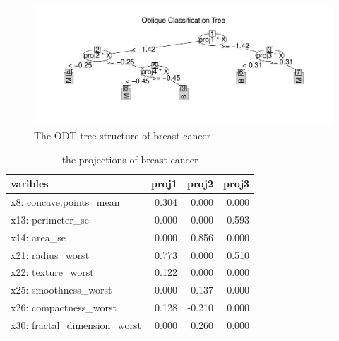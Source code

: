 \documentclass[nojss]{jss}
\numberwithin{equation}{section}
\begin{document}
\begin{figure}[t!]
\centering
\includegraphics{ODRF-plot}
\caption{\label{fig:cancer.tree} The ODT tree structure of breast cancer}
\end{figure}

\begin{table}[t!]
  \centering
    \begin{tabular}{lrrr}
    \toprule
    varibles & proj1 & proj2 & proj3 \\
    \midrule
    x8: concave.points\_mean & 0.304  & 0.000  & 0.000  \\
    x13: perimeter\_se & 0.000  & 0.000  & 0.593  \\
    x14: area\_se & 0.000  & 0.856  & 0.000  \\
    x21: radius\_worst & 0.773  & 0.000  & 0.510  \\
    x22: texture\_worst & 0.122  & 0.000  & 0.000  \\
    x25: smoothness\_worst & 0.000  & 0.137    & 0.000  \\
    x26: compactness\_worst & 0.128  & -0.210  & 0.000  \\
    x30: fractal\_dimension\_worst & 0.000  & 0.260  & 0.000  \\
    \bottomrule
    \end{tabular}%
    \caption{the projections of breast cancer}\label{tab:proj}%
\end{table}%







\end{document}
